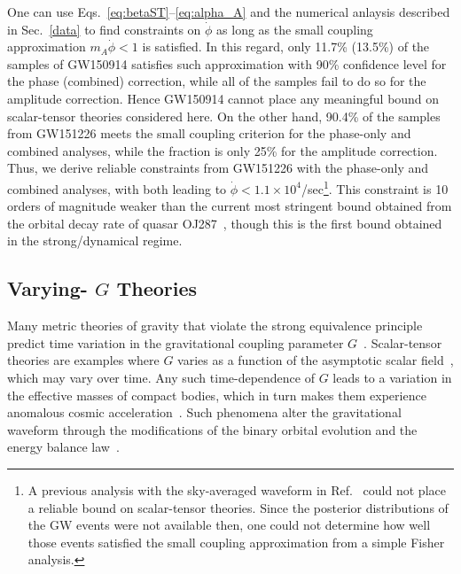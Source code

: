 \documentclass[prd,twocolumn,nofootinbib]{revtex4-1}
\begin{document}
One can use Eqs.~\eqref{eq:betaST}--\eqref{eq:alpha_A} and the numerical anlaysis described in Sec.~\ref{data} to find constraints on $\dot{\phi}$ as long as the small coupling approximation $m_A\dot{\phi}<1$ is satisfied. In this regard, only 11.7\% (13.5\%) of the samples of GW150914 satisfies such approximation with 90\% confidence level for the phase (combined) correction, while all of the samples fail to do so for the amplitude correction. Hence GW150914 cannot place any meaningful bound on scalar-tensor theories considered here. On the other hand, 90.4\% of the samples from GW151226 meets the small coupling criterion for the phase-only and combined analyses, while the fraction is only 25\% for the amplitude correction. Thus, we derive reliable constraints from GW151226 with the phase-only and combined analyses, with both leading to $\dot{\phi}<1.1\times10^4$/sec\footnote{A previous analysis with the sky-averaged waveform in Ref.~\cite{Yunes:2016jcc} could not place a reliable bound on scalar-tensor theories. Since the posterior distributions of the GW events were not available then, one could not determine how well those events satisfied the small coupling approximation from a simple Fisher analysis.}. This constraint is 10 orders of magnitude weaker than the current most stringent bound obtained from the orbital decay rate of quasar OJ287~\cite{Horbatsch:2011ye}, though this is the first bound obtained in the strong/dynamical regime.


\subsection{Varying- $G$ Theories}\label{vaying-G}
Many metric theories of gravity that violate the strong equivalence principle~\cite{DiCasola:2013iia,Will:2014kxa,0264-9381-7-10-007} predict time variation in the gravitational coupling parameter $G$~\cite{uzan:2010pm}. Scalar-tensor theories are examples where $G$ varies as a function of the asymptotic scalar field~\cite{Will2006}, which may vary over time. Any such time-dependence of $G$ leads to a variation in the effective masses of compact bodies, which in turn makes them experience anomalous cosmic acceleration~\cite{PhysRevLett.65.953}. Such phenomena alter the gravitational waveform through the modifications of the binary orbital evolution and the energy balance law~\cite{Tahura:2018zuq}.
\end{document}

